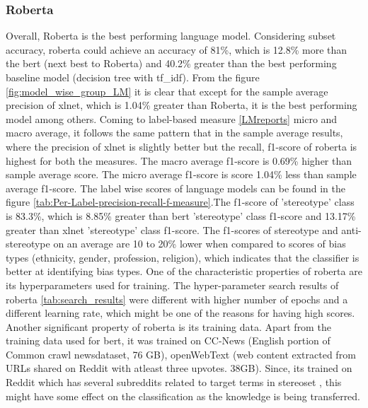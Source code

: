\subsubsection{Roberta}
Overall, Roberta is the best performing language model. Considering subset accuracy, roberta could achieve an accuracy of 81\%, which is 12.8\% more than the bert (next best to Roberta) and 40.2\% greater than the best performing baseline model (decision tree with tf\_idf). From the figure \ref{fig:model_wise_group_LM} it is clear that except for the sample average precision of xlnet, which is 1.04\% greater than Roberta, it is the best performing model among others. Coming to label-based measure \ref{LMreports} micro and macro average, it follows the same pattern that in the sample average results, where the precision of xlnet is slightly better but the recall, f1-score of roberta is highest for both the measures. The macro average f1-score is 0.69\% higher than sample average score. The micro average f1-score is score  1.04\% less than sample average f1-score. The label wise scores of language models can be found in the figure \ref{tab:Per-Label-precision-recall-f-measure}.The  f1-score of 'stereotype' class is 83.3\%, which is 8.85\% greater than bert 'stereotype' class f1-score and 13.17\% greater than xlnet 'stereotype' class f1-score. The f1-scores of stereotype and anti-stereotype on an average are 10 to 20\% lower when compared to scores of bias types (ethnicity, gender, profession, religion), which indicates that the classifier is better at identifying bias types. One of the characteristic properties of roberta are its hyperparameters used for training. The hyper-parameter search results of roberta \ref{tab:search_results} were different with higher number of epochs and a different learning rate, which might be one of the reasons for having high scores. Another significant property of roberta is its training data. Apart from the training data used for bert, it was trained on CC-News (English portion of Common crawl newsdataset, 76 GB), openWebText (web content extracted from URLs shared on Reddit with atleast three upvotes. 38GB). Since, its trained on Reddit which has several subreddits related to target terms in stereoset \cite{nadeem2020stereoset}, this might have some effect on the classification as the knowledge is being transferred. 


